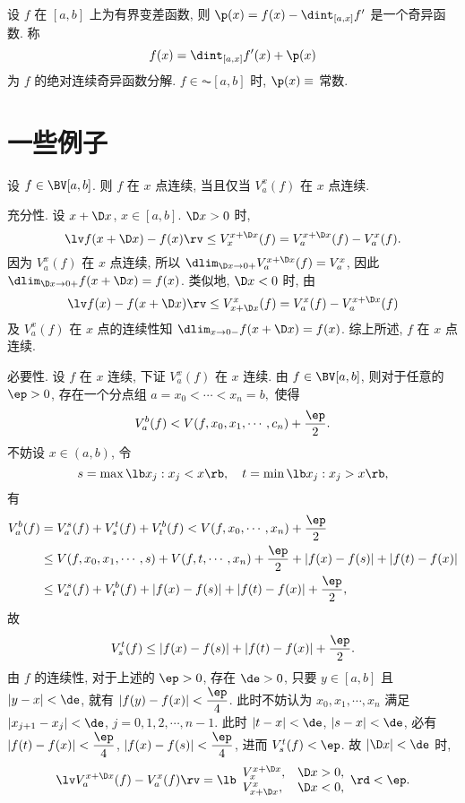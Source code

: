 \documentclass[UTF8, a4paper, 12pt, twoside, onecolumn]{book}
\begin{document}
\begin{Theorem}
	设 $f$ 在 $[a, b]$ 上为有界变差函数, 则 $\p(x) = f(x) - \dint_{[a, x]} f'$ 是一个奇异函数. 称
	$$f(x) = \dint_{[a, x]} f'(x) + \p(x)$$
	为 $f$ 的绝对连续奇异函数分解. $f \in \AC [a, b]$ 时, $\p(x) \equiv$ 常数.
\end{Theorem}

\section{一些例子}

\begin{Example}
	设 $f \in \BV[a, b]$. 则 $f$ 在 $x$ 点连续, 当且仅当 $V_a^x(f)$ 在 $x$ 点连续.
\end{Example}

\begin{Proof}
	充分性. 设 $x + \D x$, $x \in [a, b]$. $\D x > 0$ 时,
	$$\lv f(x + \D x) - f(x)\rv \leq V_x^{x + \D x}(f) = V_a^{x + \D x}(f) - V_a^x(f).$$
	因为 $V_a^x(f)$ 在 $x$ 点连续, 所以 $\dlim_{\D x \to 0+} V_a^{x + \D x}(f) = V_a^x$, 因此 $\dlim_{\D x \to 0+} f(x + \D x) = f(x)$. 类似地, $\D x < 0$ 时, 由
	$$\lv f(x) - f(x + \D x)\rv \leq V_{x + \D x}^x(f) = V_a^x(f) - V_a^{x + \D x}(f)$$
	及 $V_a^x(f)$ 在 $x$ 点的连续性知 $\dlim_{x \to 0-} f(x + \D x) = f(x)$. 综上所述, $f$ 在 $x$ 点连续.

	必要性. 设 $f$ 在 $x$ 连续, 下证 $V_a^x(f)$ 在 $x$ 连续. 由 $f \in \BV[a, b]$, 则对于任意的 $\ep > 0$, 存在一个分点组 $a = x_0 < \cdots < x_n = b,$ 使得
	$$V_a^b (f) < V(f, x_0, x_1, \cdots, c_n) + \dfrac{\ep}{2}.$$
	不妨设 $x \in (a, b)$, 令
	$$s = \max\lb x_j : x_j < x \rb,\quad t = \min\lb x_j : x_j > x \rb,$$
	有
	\begin{align*}
		V_a^b(f) &= V_a^s(f) + V_s^t(f) + V_t^b(f) < V(f, x_0, \cdots, x_n) + \dfrac{\ep}{2}\\
		&\leq V(f, x_0, x_1, \cdots, s) + V(f, t, \cdots, x_n) + \dfrac{\ep}{2} + |f(x) - f(s)| + |f(t) - f(x)|\\
		&\leq V_a^s(f) + V_t^b(f) + |f(x) - f(s)| + |f(t) - f(x)| + \dfrac{\ep}{2},
	\end{align*}
	故
	$$V_s^t(f) \leq |f(x) - f(s)| + |f(t) - f(x)| + \dfrac{\ep}{2}.$$
	由 $f$ 的连续性, 对于上述的 $\ep > 0$, 存在 $\de > 0$, 只要 $y \in [a, b]$ 且 $|y - x| < \de$, 就有 $|f(y) - f(x)| < \dfrac{\ep}{4}$. 此时不妨认为 $x_0, x_1, \cdots, x_n$ 满足 $|x_{j + 1} - x_j| < \de$, $j = 0, 1, 2, \cdots, n - 1$. 此时 $|t - x| < \de$, $|s - x| < \de$, 必有 $|f(t) - f(x)| < \dfrac{\ep}{4}$, $|f(x) - f(s)| < \dfrac{\ep}{4}$, 进而 $V_s^t(f) < \ep$. 故 $|\D x| < \de$ 时,
	\begin{align*}
		\lv V_a^{x + \D x}(f) - V_a^x(f)\rv = \lb\begin{array}{ll}
			V_x^{x + \D x}, & \D x > 0, \\
			V_{x + \D x}^x, & \D x < 0,
		\end{array}\rd < \ep.
	\end{align*}
\end{Proof}
\end{document}
